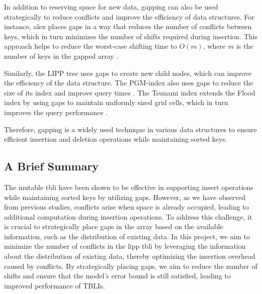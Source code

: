 In addition to reserving space for new data, gapping can also be used strategically to reduce conflicts and improve the efficiency of data structures. For instance, \acrshort{alex} places gaps in a way that reduces the number of conflicts between keys, which in turn minimizes the number of shifts required during insertion. This approach helps to reduce the worst-case shifting time to $O(m)$, where $m$ is the number of keys in the gapped array \cite{ALEX}.

Similarly, the LIPP tree \cite{LIPP} uses gaps to create new child nodes, which can improve the efficiency of the data structure. The PGM-index also uses gaps to reduce the size of its index and improve query times \cite{PGM}. The Tsunami index extends the Flood index by using gaps to maintain uniformly sized grid cells, which in turn improves the query performance \cite{Tsunami}.

Therefore, gapping is a widely used technique in various data structures to ensure efficient insertion and deletion operations while maintaining sorted keys.

\subsection{A Brief Summary}
The mutable \acrfull{tbli} have been shown to be effective in supporting insert operations while maintaining sorted keys by utilizing gaps. However, as we have observed from previous studies, conflicts arise when space is already occupied, leading to additional computation during insertion operations. To address this challenge, it is crucial to strategically place gaps in the array based on the available information, such as the distribution of existing data. In this project, we aim to minimize the number of conflicts in the \acrshort{lipp} \acrshort{tbli} by leveraging the information about the distribution of existing data, thereby optimizing the insertion overhead caused by conflicts. By strategically placing gaps, we aim to reduce the number of shifts and ensure that the model's error bound is still satisfied, leading to improved performance of TBLIs.

